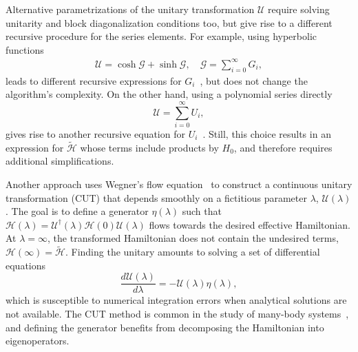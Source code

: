 Alternative parametrizations of the unitary transformation $\mathcal{U}$ require solving unitarity and block diagonalization conditions too, but give rise to a different recursive procedure for the series elements.
For example, using hyperbolic functions
%
\begin{gather}
\mathcal{U} = \cosh{\mathcal{G}} + \sinh{\mathcal{G}}, \quad
\mathcal{G} = \sum_{i=0}^{\infty} G_i,
\end{gather}
%
leads to different recursive expressions for $G_i$~\cite{Shavitt_1980}, but does not change the algorithm's complexity.
On the other hand, using a polynomial series directly
%
\begin{equation}
\mathcal{U} = \sum_{i=0}^{\infty} U_i,
\end{equation}
%
gives rise to another recursive equation for $U_i$~\cite{Van_Vleck_1929, Lowdin_1962, Klein_1974, Suzuki_1983}.
Still, this choice results in an expression for $\tilde{\mathcal{H}}$ whose terms include products by $H_0$, and therefore requires additional simplifications.

Another approach uses Wegner's flow equation~\cite{Wegner_1994,Kehrein_2007} to construct a continuous unitary transformation (CUT) that depends smoothly on a fictitious parameter $\lambda$, $\mathcal{U}(\lambda)$.
The goal is to define a generator $\mathcal{\eta}(\lambda)$ such that $\mathcal{H}(\lambda) = \mathcal{U}^\dagger(\lambda) \mathcal{H}(0) \mathcal{U}(\lambda)$ flows towards the desired effective Hamiltonian.
At $\lambda = \infty$, the transformed Hamiltonian does not contain the undesired terms, $\mathcal{H}(\infty) = \tilde{\mathcal{H}}$.
Finding the unitary amounts to solving a set of differential equations
%
\begin{equation}
\frac{d\mathcal{U}(\lambda)}{d\lambda} = -\mathcal{U}(\lambda) \mathcal{\eta}(\lambda),
\end{equation}
%
which is susceptible to numerical integration errors when analytical solutions are not available.
The CUT method is common in the study of many-body systems~\cite{Krull_2012}, and defining the generator benefits from decomposing the Hamiltonian into eigenoperators.

